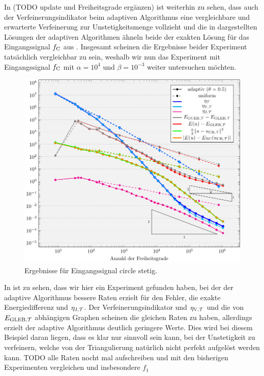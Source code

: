 In  (TODO update und Freiheitsgrade ergänzen) ist
weiterhin zu sehen, dass auch der
Verfeinerungsindikator beim adaptiven Algorithmus eine vergleichbare und
erwarterte Verfeinerung zur Unstetigkeitsmenge vollzieht und die in
 dargestellten Lösungen der adaptiven Algorithmen
ähneln beide der exakten Lösung für das Eingangssignal $f_\textup{C}$
aus .
Insgesamt scheinen die Ergebnisse beider Experiment tatsächlich vergleichbar
zu sein, weshalb wir nun das Experiment mit Eingangssignal $f_\textup{C}$
mit $\alpha=10^4$ und $\beta=10^{-3}$ weiter untersuchen möchten.
\begin{figure}[p]
  \centering
  \includegraphics[width=\linewidth]
    {pictures/chapExperiments/secGrayscale/circ/convCont.pdf}
  \caption{Ergebnisse für Eingangssignal circle stetig.}
  \label{fig:circContConvergence}
\end{figure}
In  ist zu sehen, dass wir hier ein Experiment
gefunden haben, bei der der adaptive Algorithmus bessere Raten erzielt
für den Fehler, die exakte Energiedifferenz und $\eta_{\textup{J}, \mathcal{T}}$. 
Der Verfeinerungsindikator und $\eta_{\textup{V}, \mathcal{T}}$ und die von $E_{\textup{GLEB}, \mathcal{T}}$ abhängigen Graphen
scheinen die gleichen Raten zu haben, allerdings erzielt der adaptive
Algorithmus deutlich geringere Werte.
Dies wird bei diesem Beispiel daran liegen, dass es klar nur sinnvoll sein kann, 
bei der Unstetigkeit zu verfeinern, welche von der Triangulierung 
natürlich nicht perfekt aufgelöst werden kann.
TODO alle Raten nocht mal aufschreiben und mit den bisherigen Experimenten 
vergleichen und insbesondere $f_1$


